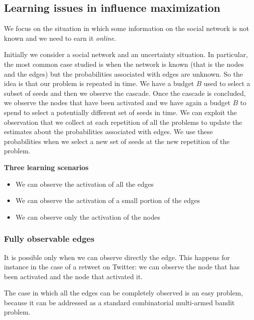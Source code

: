 \documentclass[10pt,a4paper]{article}
\begin{document}
\subsection{Learning issues in influence maximization}\label{learning-issues-in-influence-maximization}

We focus on the situation in which some information on the social network is not known and we need to earn it \textit{online}.

Initially we consider a social network and an uncertainty situation. In particular, the most common case studied is when the network is known (that is the nodes and the edges) but the probabilities associated with edges are unknown. So the idea is that our problem is repeated in time. We have a budget $B$ used to select a subset of seeds and then we observe the cascade. Once the cascade is concluded, we observe the nodes that have been activated and we have again a budget $B$ to spend to select a potentially different set of seeds in time. We can exploit the observation that we collect at each repetition of all the problems to update the estimates about the probabilities associated with edges. We use these probabilities when we select a new set of seeds at the new repetition of the problem.
\newline

\textbf{Three learning scenarios}

\begin{itemize}

\item We can observe the activation of all the edges
\item We can observe the activation of a small portion of the edges
\item We can observe only the activation of the nodes
\end{itemize}

\subsubsection{Fully observable edges}\label{fully-observable-edges}

It is possible only when we can observe directly the edge. This happens for instance in the case of a retweet on Twitter: we can observe the node that has been activated and the node that activated it.

The case in which all the edges can be completely observed is an easy problem, because it can be addressed as a standard combinatorial multi-armed bandit problem.
\newline
\end{document}
